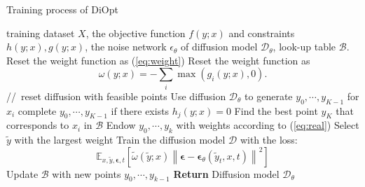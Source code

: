 \begin{algorithm}[tb]
   \caption{Training process of DiOpt}
   \label{algo:dsg}
\begin{algorithmic}

    training dataset $X$,  the objective function $f(y;x)$ and constraints $h(y;x), g(y;x)$, the noise network $\epsilon_\theta$ of diffusion model $\mathcal{D}_\theta$, look-up table $\mathcal{B}$.
            \STATE Reset the weight function as (\ref{eq:weight})
        \ELSE
            \STATE Reset the weight function as
            \[
                \omega(y;x) = -\sum_i \max(g_i(y;x), 0). 
            \]
             \STATE \;\textcolor[rgb]{0.5,0.5,0.5}{//\, reset diffusion with feasible points}
        \ENDIF
            \STATE Use diffusion $\mathcal{D}_\theta$ to generate $y_0,\cdots, y_{K-1}$ for $x_i$
            \STATE  \textcolor[rgb]{0.5,0.5,0.5}{ complete $y_0, \cdots, y_{K-1}$  if there exists $h_j(y;x)=0$}
            \STATE Find the best point $y_{K}$ that corresponds to $x_i$ in $\mathcal{B}$
            \STATE Endow $y_0, \cdots, y_{k}$ with weights according to (\ref{eq:real})
            \STATE Select $\tilde{y}$ with the largest weight
            \STATE Train the diffusion model $\mathcal{D}$ with the loss: 
            \[
                \mathbb{E}_{x, \tilde{y}, \boldsymbol{\epsilon}, t}\left[\tilde{\omega}(\tilde{y};x) \left\|\boldsymbol{\epsilon}-\boldsymbol{\epsilon}_{\theta}\left(\tilde{y}_t, x, t\right)\right\|^{2}\right]
            \]
            \STATE Update $\mathcal{B}$ with new points $y_0, \cdots, y_{k-1}$
       \ENDFOR
   \ENDFOR
   \STATE \textbf{Return} Diffusion model $\mathcal{D}_\theta$
\end{algorithmic}
\end{algorithm}
